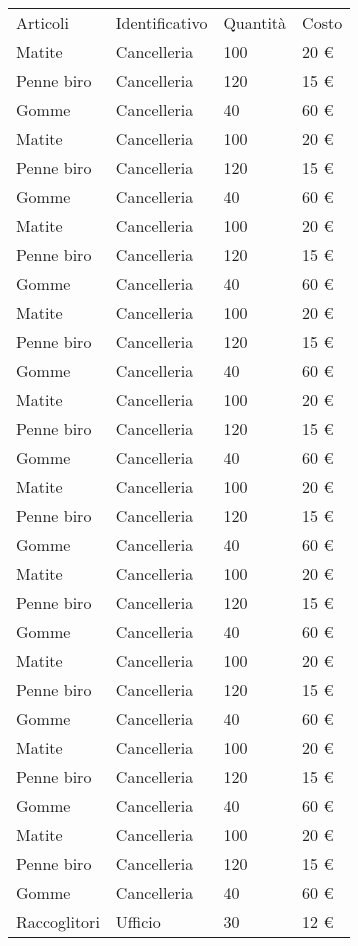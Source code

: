 \begin{center}
\begin{longtable}{llll}
Articoli      & Identificativo & Quantità & Costo \\
Matite        & Cancelleria    & 100      & 20 \euro{}\\
Penne biro    & Cancelleria    & 120      & 15 \euro{}\\
Gomme         & Cancelleria    & 40       & 60 \euro{}\\
Matite        & Cancelleria    & 100      & 20 \euro{}\\
Penne biro    & Cancelleria    & 120      & 15 \euro{}\\
Gomme         & Cancelleria    & 40       & 60 \euro{}\\
Matite        & Cancelleria    & 100      & 20 \euro{}\\
Penne biro    & Cancelleria    & 120      & 15 \euro{}\\
Gomme         & Cancelleria    & 40       & 60 \euro{}\\
Matite        & Cancelleria    & 100      & 20 \euro{}\\
Penne biro    & Cancelleria    & 120      & 15 \euro{}\\
Gomme         & Cancelleria    & 40       & 60 \euro{}\\
Matite        & Cancelleria    & 100      & 20 \euro{}\\
Penne biro    & Cancelleria    & 120      & 15 \euro{}\\
Gomme         & Cancelleria    & 40       & 60 \euro{}\\
Matite        & Cancelleria    & 100      & 20 \euro{}\\
Penne biro    & Cancelleria    & 120      & 15 \euro{}\\
Gomme         & Cancelleria    & 40       & 60 \euro{}\\
Matite        & Cancelleria    & 100      & 20 \euro{}\\
Penne biro    & Cancelleria    & 120      & 15 \euro{}\\
Gomme         & Cancelleria    & 40       & 60 \euro{}\\
Matite        & Cancelleria    & 100      & 20 \euro{}\\
Penne biro    & Cancelleria    & 120      & 15 \euro{}\\
Gomme         & Cancelleria    & 40       & 60 \euro{}\\
Matite        & Cancelleria    & 100      & 20 \euro{}\\
Penne biro    & Cancelleria    & 120      & 15 \euro{}\\
Gomme         & Cancelleria    & 40       & 60 \euro{}\\
Matite        & Cancelleria    & 100      & 20 \euro{}\\
Penne biro    & Cancelleria    & 120      & 15 \euro{}\\
Gomme         & Cancelleria    & 40       & 60 \euro{}\\
Raccoglitori  & Ufficio        & 30       & 12 \euro{}\\


\end{longtable}
\end{center}
